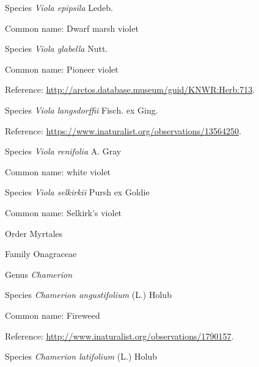 \documentclass[9pt, article]{memoir}
\begin{document}
\begin{multicols}{2}
\vspace{6pt}\noindent\hspace{36pt}Species \textit{Viola epipsila} Ledeb.


Common name: Dwarf marsh violet

\vspace{6pt}\noindent\hspace{36pt}Species \textit{Viola glabella} Nutt.


Common name: Pioneer violet

Reference: 
\url{http://arctos.database.museum/guid/KNWR:Herb:713}.

\vspace{6pt}\noindent\hspace{36pt}Species \textit{Viola langsdorffii} Fisch. ex Ging.


Reference: 
\url{https://www.inaturalist.org/observations/13564250}.

\vspace{6pt}\noindent\hspace{36pt}Species \textit{Viola renifolia} A. Gray


Common name: white violet

\vspace{6pt}\noindent\hspace{36pt}Species \textit{Viola selkirkii} Pursh ex Goldie


Common name: Selkirk's violet

\vspace{6pt}\noindent\hspace{18pt}Order Myrtales


\vspace{6pt}\noindent\hspace{24pt}Family Onagraceae


\vspace{6pt}\noindent\hspace{30pt}Genus \textit{Chamerion}


\vspace{6pt}\noindent\hspace{36pt}Species \textit{Chamerion angustifolium} (L.) Holub


Common name: Fireweed

Reference: 
\url{http://www.inaturalist.org/observations/1790157}.

\vspace{6pt}\noindent\hspace{36pt}Species \textit{Chamerion latifolium} (L.) Holub



\end{multicols}
\end{document}
